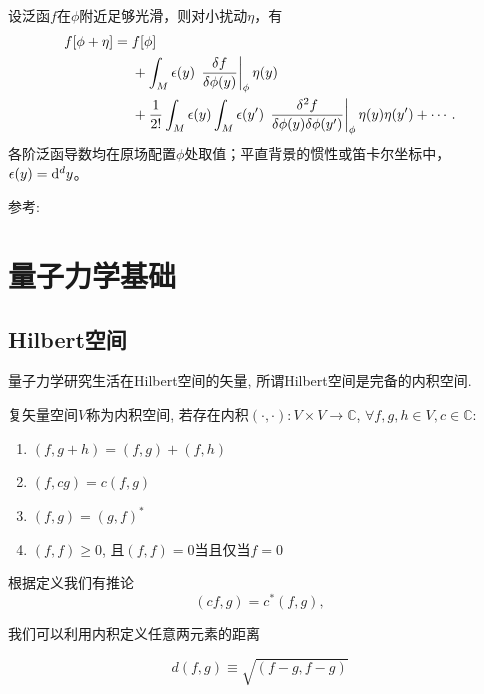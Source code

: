 \begin{theorem}[泛函的Taylor展开]
    设泛函$f$在$\phi$附近足够光滑，则对小扰动$\eta$，有
    \begin{align}
        f[\phi+\eta]={}&f[\phi]\notag\\
        &+\int_M\epsilon(y)\,
        \left.\frac{\delta f}{\delta\phi(y)}\right|_{\phi}\eta(y)\notag\\
        &+\frac{1}{2!}\int_M\epsilon(y)\int_M\epsilon(y')\,
        \left.\frac{\delta^2f}{\delta\phi(y)\delta\phi(y')}\right|_{\phi}
        \eta(y)\eta(y')+\cdots.
    \end{align}
    各阶泛函导数均在原场配置$\phi$处取值；平直背景的惯性或笛卡尔坐标中，$\epsilon(y)=\mathrm d^dy$。
\end{theorem}
参考: \cite{functionals}


\newpage

\section{量子力学基础}
\subsection{Hilbert空间}
量子力学研究生活在Hilbert空间\cite{LiangQMMath}的矢量, 所谓Hilbert空间是完备的内积空间.
\begin{definition}[内积空间]
    复矢量空间$V$称为内积空间, 若存在内积$(\cdot, \cdot): V\times V\to \mathbb{C}$, $\forall f, g, h\in V, c\in\mathbb C$:
    \begin{enumerate}
        \item $(f, g+h)=(f, g)+(f, h)$
        \item $(f, cg)=c(f, g)$
        \item $(f, g)=(g, f)^*$
        \item $(f, f)\ge0$, 且$(f, f)=0$当且仅当$f=0$
    \end{enumerate}
\end{definition}
根据定义我们有推论
\begin{equation}
    (cf, g)=c^*(f, g),
\end{equation}

我们可以利用内积定义任意两元素的距离
\begin{definition}[元素距离]
    \begin{equation}
        d(f, g)\equiv\sqrt{(f-g, f-g)}
    \end{equation}
\end{definition}

